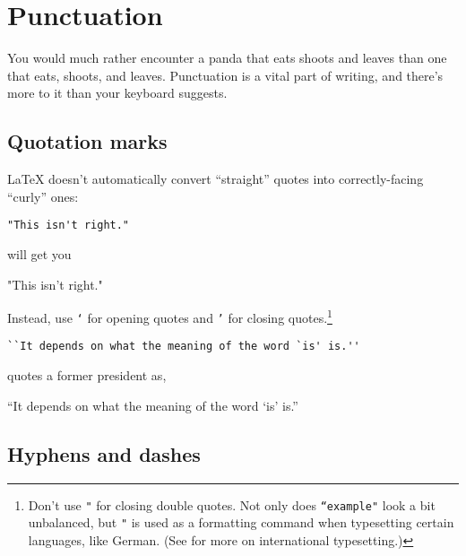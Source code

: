 \chapter{Punctuation}
\label{punctuation}

You would much rather encounter a panda that eats
shoots and leaves than one that eats, shoots,
and leaves.\punckern{}
Punctuation is a vital part of writing,
and there's more to it than your keyboard suggests.

\section{Quotation marks}

\LaTeX{} doesn't automatically convert ``straight'' quotes
into correctly-facing ``curly'' ones:
\begin{leftfigure}
\begin{lstlisting}
"This isn't right."
\end{lstlisting}
\end{leftfigure}
will get you
\begin{leftfigure}
\lm%
"This isn't right."
\end{leftfigure}
Instead, use \texttt{`} for opening quotes and \texttt{'} for closing
quotes.\punckern\footnote{Don't use \texttt{"} for closing double quotes.
Not only does \texttt{``example"} look a bit unbalanced,
but \texttt{"} is used as a formatting command when typesetting certain
languages, like German. (See  for more on international
typesetting.)}
\begin{leftfigure}
\begin{lstlisting}
``It depends on what the meaning of the word `is' is.''
\end{lstlisting}
\end{leftfigure}
quotes a former  president as,
\begin{leftfigure}
\lm%
``It depends on what the meaning of the word `is' is.''
\end{leftfigure}

\section{Hyphens and dashes}

